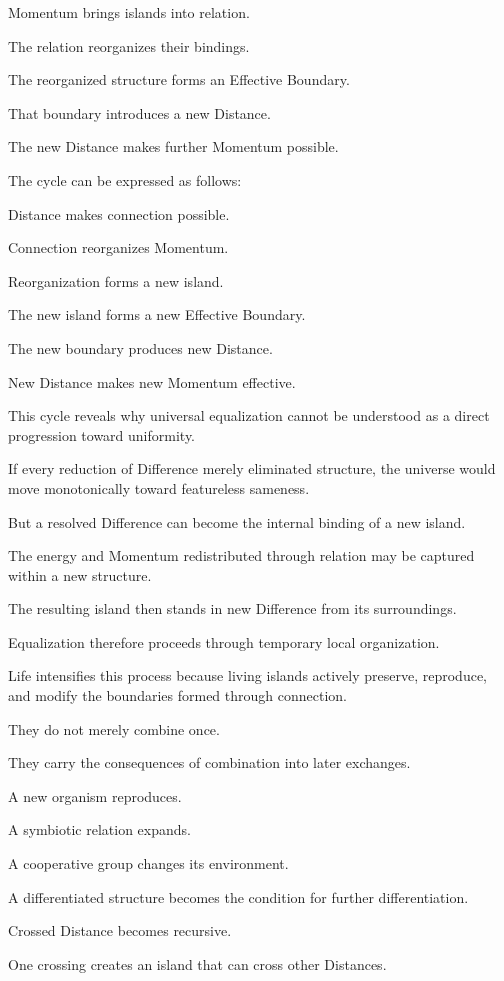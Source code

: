 Momentum brings islands into relation.

The relation reorganizes their bindings.

The reorganized structure forms an Effective Boundary.

That boundary introduces a new Distance.

The new Distance makes further Momentum possible.

The cycle can be expressed as follows:

Distance makes connection possible.

Connection reorganizes Momentum.

Reorganization forms a new island.

The new island forms a new Effective Boundary.

The new boundary produces new Distance.

New Distance makes new Momentum effective.

This cycle reveals why universal equalization cannot be understood as a direct progression toward uniformity.

If every reduction of Difference merely eliminated structure, the universe would move monotonically toward featureless sameness.

But a resolved Difference can become the internal binding of a new island.

The energy and Momentum redistributed through relation may be captured within a new structure.

The resulting island then stands in new Difference from its surroundings.

Equalization therefore proceeds through temporary local organization.

Life intensifies this process because living islands actively preserve, reproduce, and modify the boundaries formed through connection.

They do not merely combine once.

They carry the consequences of combination into later exchanges.

A new organism reproduces.

A symbiotic relation expands.

A cooperative group changes its environment.

A differentiated structure becomes the condition for further differentiation.

Crossed Distance becomes recursive.

One crossing creates an island that can cross other Distances.

